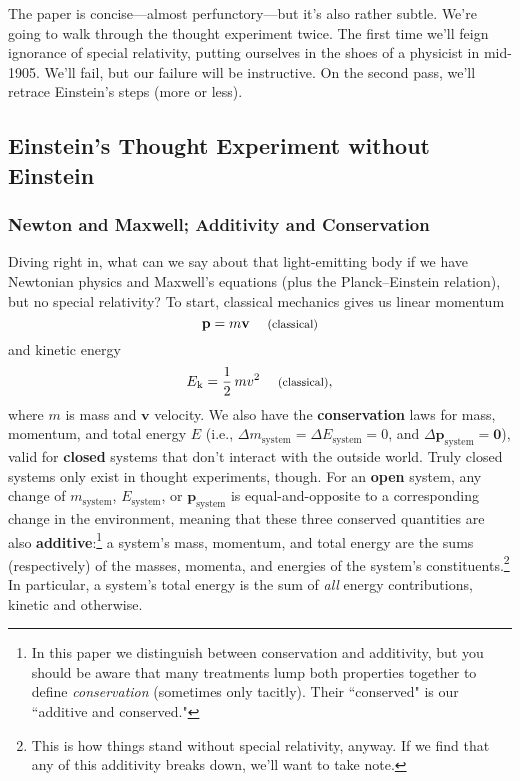 \documentclass[12pt]{article}
\renewcommand{\vv}[1]{\mathbf{#1}}
\begin{document}
The paper is concise---almost perfunctory---but it's also rather subtle. We're going to walk through the thought experiment twice. The first time we'll feign ignorance of special relativity, putting ourselves in the shoes of a physicist in mid-1905. We'll fail, but our failure will be instructive. On the second pass, we'll retrace Einstein's steps (more or less).


\subsection{Einstein's Thought Experiment without Einstein}
 
\subsubsection{Newton and Maxwell; Additivity and Conservation}

Diving right in, what can we say about that light-emitting body if we have Newtonian physics and Maxwell's equations (plus the Planck--Einstein relation), but no special relativity? To start, classical mechanics gives us linear momentum
\begin{equation}\label{eq:1}
\vv p=m\vv v \quad \text{\footnotesize{ (classical)}}
\end{equation}
and kinetic energy
\begin{equation}\label{eq:2}
E_{\mkern.5mu \textrm{k}}= \frac{1}{2} \, m v ^2 \quad \text{\footnotesize{ (classical)}},
\end{equation}
where $m$ is mass and $\vv{v}$ velocity. We also have the \textbf{conservation} laws for mass, momentum, and total energy $E$ (i.e., $\Delta m_{\mathrm{system}} = \Delta E_{\mathrm{system}} = 0$, and $\Delta \vv p_{\mathrm{system}} = \vv 0$), valid for \textbf{closed} systems that don't interact with the outside world. Truly closed systems only exist in thought experiments, though. For an \textbf{open} system, any change of $m_{\mathrm{system}}$, $E_{\mathrm{system}}$, or $\vv p_{\mathrm{system}}$ is equal-and-opposite to a corresponding change in the environment, meaning that these three conserved quantities are also \textbf{additive}:\footnote{In this paper we distinguish between conservation and additivity, but you should be aware that many treatments lump both properties together to define \emph{conservation} (sometimes only tacitly). Their ``conserved" is our ``additive and conserved."} a system's mass, momentum, and total energy are the sums (respectively) of the masses, momenta, and energies of the system's constituents.\footnote{\label{fn:ad}This is how things stand without special relativity, anyway. If we find that any of this additivity breaks down, we'll want to take note.} In particular, a system's total energy is the sum of \emph{all} energy contributions, kinetic and otherwise.
\end{document}
